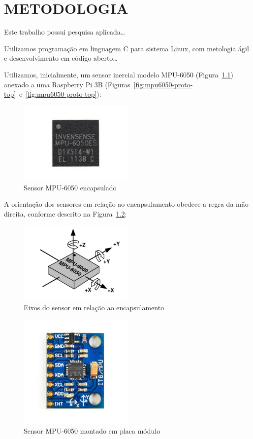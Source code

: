 \chapter{METODOLOGIA}\label{chap:metodologia}

Este trabalho possui pesquisa aplicada\ldots

Utilizamos programação em linguagem C para sistema Linux, com metologia ágil e desenvolvimento em código aberto\ldots

Utilizamos, inicialmente, um sensor inercial modelo MPU-6050 (Figura~\ref{fig:mpu6050-sensor-top}) anexado a uma Raspberry Pi 3B (Figuras~\ref{fig:mpu6050-proto-top}~e~\ref{fig:mpu6050-proto-top}):
\begin{figure}[H]
    \centering
    \caption{Sensor MPU-6050 encapsulado}\label{fig:mpu6050-sensor-top}
    \includegraphics[width=0.5\textwidth]{figuras/mpu6050-sensor-top-straight.jpg}
\end{figure}
A orientação dos sensores em relação ao encapsulamento obedece a regra da mão direita, conforme descrito na Figura~\ref{fig:mpu6050-diagram-axis}:
\begin{figure}[H]
    \centering
    \caption{Eixos do sensor em relação ao encapsulamento}\label{fig:mpu6050-diagram-axis}
    \includegraphics[width=0.5\textwidth]{figuras/mpu6050-diagram-axis.jpg}
\end{figure}
\begin{figure}[H]
    \centering
    \caption{Sensor MPU-6050 montado em placa módulo}\label{fig:mpu6050-board-top}
    \includegraphics[width=0.5\textwidth]{figuras/mpu6050-board-top.jpg}
\end{figure}
